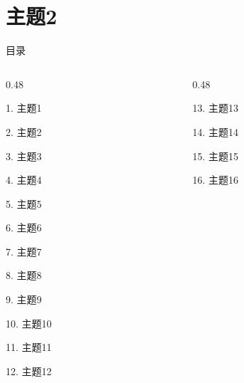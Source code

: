 \documentclass[aspectratio=169,10pt,fontset=fandol]{ctexbeamer}
\begin{document}
\section{主题2}
\begin{frame}[t,fragile]{目录}
\small
\begin{columns}[T,onlytextwidth]
\begin{column}{0.48\textwidth}
{\color{black}\small 1. 主题1\par}\vspace{0.22em}
{\color{blue}\small 2. 主题2\par}\vspace{0.22em}
{\color{gray!40}\small 3. 主题3\par}\vspace{0.22em}
{\color{gray!40}\small 4. 主题4\par}\vspace{0.22em}
{\color{gray!40}\small 5. 主题5\par}\vspace{0.22em}
{\color{gray!40}\small 6. 主题6\par}\vspace{0.22em}
{\color{gray!40}\small 7. 主题7\par}\vspace{0.22em}
{\color{gray!40}\small 8. 主题8\par}\vspace{0.22em}
{\color{gray!40}\small 9. 主题9\par}\vspace{0.22em}
{\color{gray!40}\small 10. 主题10\par}\vspace{0.22em}
{\color{gray!40}\small 11. 主题11\par}\vspace{0.22em}
{\color{gray!40}\small 12. 主题12\par}\vspace{0.22em}
\end{column}
\begin{column}{0.48\textwidth}
{\color{gray!40}\small 13. 主题13\par}\vspace{0.22em}
{\color{gray!40}\small 14. 主题14\par}\vspace{0.22em}
{\color{gray!40}\small 15. 主题15\par}\vspace{0.22em}
{\color{gray!40}\small 16. 主题16\par}\vspace{0.22em}

\end{column}
\end{columns}
\end{frame}
\end{document}
